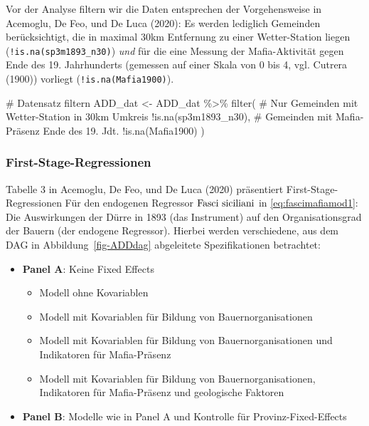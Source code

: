 \documentclass[
  a4paper,
  DIV=11,
  oneside]{scrreprt}
\newenvironment{Shaded}{\begin{snugshade}}{\end{snugshade}}
\newcommand{\CommentTok}[1]{\textcolor[rgb]{0.37,0.37,0.37}{#1}}
\newcommand{\FunctionTok}[1]{\textcolor[rgb]{0.28,0.35,0.67}{#1}}
\newcommand{\NormalTok}[1]{\textcolor[rgb]{0.00,0.23,0.31}{#1}}
\newcommand{\OtherTok}[1]{\textcolor[rgb]{0.00,0.23,0.31}{#1}}
\newcommand{\SpecialCharTok}[1]{\textcolor[rgb]{0.37,0.37,0.37}{#1}}
\providecommand{\tightlist}{%
  \setlength{\itemsep}{0pt}\setlength{\parskip}{0pt}}\usepackage{longtable,booktabs,array}
\begin{document}
\endgroup

Vor der Analyse filtern wir die Daten entsprechen der Vorgehensweise in
Acemoglu, De Feo, und De Luca (2020): Es werden lediglich Gemeinden
berücksichtigt, die in maximal 30km Entfernung zu einer Wetter-Station
liegen (\texttt{!is.na(sp3m1893\_n30)}) \emph{und} für die eine Messung
der Mafia-Aktivität gegen Ende des 19. Jahrhunderts (gemessen auf einer
Skala von 0 bis 4, vgl. Cutrera (1900)) vorliegt
(\texttt{!is.na(Mafia1900)}).

\begin{Shaded}
\begin{Highlighting}[]
\CommentTok{\# Datensatz filtern}
\NormalTok{ADD\_dat }\OtherTok{\textless{}{-}}\NormalTok{ ADD\_dat }\SpecialCharTok{\%\textgreater{}\%}
  \FunctionTok{filter}\NormalTok{(}
    \CommentTok{\# Nur Gemeinden mit Wetter{-}Station in 30km Umkreis}
    \SpecialCharTok{!}\FunctionTok{is.na}\NormalTok{(sp3m1893\_n30), }
    \CommentTok{\# Gemeinden mit Mafia{-}Präsenz Ende des 19. Jdt.}
    \SpecialCharTok{!}\FunctionTok{is.na}\NormalTok{(Mafia1900)}
\NormalTok{  )}
\end{Highlighting}
\end{Shaded}

\subsubsection{First-Stage-Regressionen}\label{first-stage-regressionen}

Tabelle 3 in Acemoglu, De Feo, und De Luca (2020) präsentiert
First-Stage-Regressionen Für den endogenen Regressor
\(\textup{Fasci siciliani}\) in \eqref{eq:fascimafiamod1}: Die
Auswirkungen der Dürre in 1893 (das Instrument) auf den
Organisationsgrad der Bauern (der endogene Regressor). Hierbei werden
verschiedene, aus dem DAG in Abbildung~\ref{fig-ADDdag} abgeleitete
Spezifikationen betrachtet:

\begin{itemize}
\tightlist
\item
  \textbf{Panel A}: Keine Fixed Effects

  \begin{itemize}
  \tightlist
  \item
    Modell ohne Kovariablen
  \item
    Modell mit Kovariablen für Bildung von Bauernorganisationen
  \item
    Modell mit Kovariablen für Bildung von Bauernorganisationen und
    Indikatoren für Mafia-Präsenz
  \item
    Modell mit Kovariablen für Bildung von Bauernorganisationen,
    Indikatoren für Mafia-Präsenz und geologische Faktoren
  \end{itemize}
\item
  \textbf{Panel B}: Modelle wie in Panel A und Kontrolle für
  Provinz-Fixed-Effects
\end{itemize}
\end{document}
